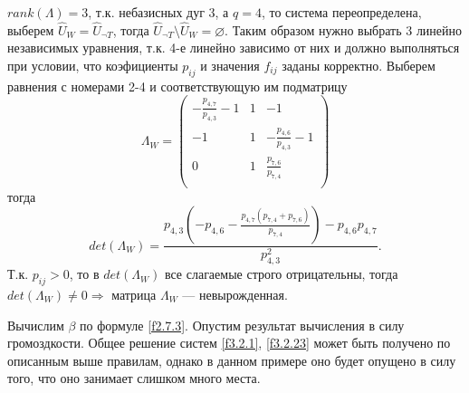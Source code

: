 \documentclass[14pt]{extarticle}%
\begin{document}
$rank(\Lambda)=3$, т.к. небазисных дуг 3, а $q=4$, то система переопределена, выберем $\widehat{U}_W=\widehat{U}_{\neg T}$, тогда $\widehat{U}_{\neg T}\setminus\widehat{U}_W=\varnothing$. Таким образом нужно выбрать 3 линейно независимых уравнения, т.к. 4-е линейно зависимо от них и должно выполняться при условии, что коэфициенты $p_{ij}$ и значения $f_{ij}$ заданы корректно. Выберем равнения с номерами 2-4 и соответствующую им подматрицу
$$\Lambda_W=
\left(
\begin{array}{ccc}
 -\frac{p_{4,7}}{p_{4,3}}-1 & 1 & -1 \\
 -1 & 1 & -\frac{p_{4,6}}{p_{4,3}}-1 \\
 0 & 1 & \frac{p_{7,6}}{p_{7,4}} \\
\end{array}
\right)$$
тогда 
$$det(\Lambda_W)=\frac{p_{4,3} \left(-p_{4,6}-\frac{p_{4,7} \left(p_{7,4}+p_{7,6}\right)}{p_{7,4}}\right)-p_{4,6} p_{4,7}}{p_{4,3}^2}.$$
Т.к. $p_{ij}>0$, то в $det(\Lambda_W)$ все слагаемые строго отрицательны, тогда $det(\Lambda_W)\neq 0 \Rightarrow$ матрица $\Lambda_W$ --- невырожденная. 

Вычислим $\beta$ по формуле \eqref{f2.7.3}. Опустим результат вычисления в силу громоздкости.
Общее решение систем \eqref{f3.2.1}, \eqref{f3.2.23} может быть получено по описанным выше правилам, однако в данном примере оно будет опущено в силу того, что оно занимает слишком много места.





\end{document}
